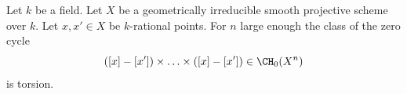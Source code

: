 %
\begin{lemma}[Voevodsky]
\label{lemma-smash-nilpotence}
\begin{reference}
\cite{nilpotence}
\end{reference}
Let $k$ be a field. Let $X$ be a geometrically irreducible
smooth projective scheme over $k$. Let $x, x' \in X$ be $k$-rational points.
For $n$ large enough the class of the zero cycle
$$
([x] - [x']) \times \ldots \times ([x] - [x']) \in
\CH_0(X^n)
$$
is torsion.
\end{lemma}

